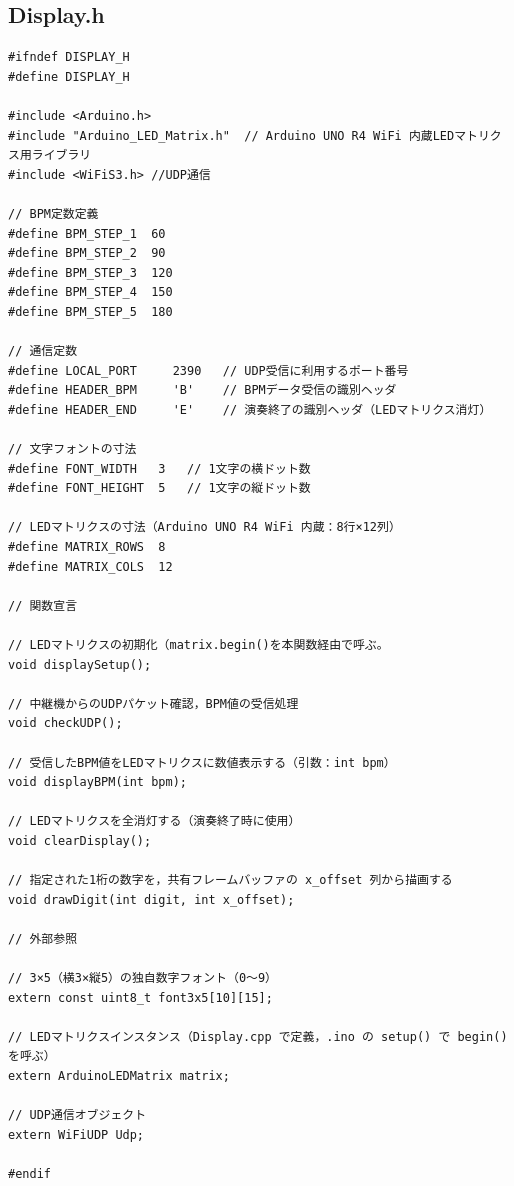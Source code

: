 \documentclass[uplatex,dvipdfmx,a4paper,11pt]{jsarticle}
\begin{document}
\subsection{Display.h}
\begin{lstlisting}
#ifndef DISPLAY_H
#define DISPLAY_H

#include <Arduino.h>
#include "Arduino_LED_Matrix.h"  // Arduino UNO R4 WiFi 内蔵LEDマトリクス用ライブラリ
#include <WiFiS3.h> //UDP通信

// BPM定数定義
#define BPM_STEP_1  60
#define BPM_STEP_2  90
#define BPM_STEP_3  120
#define BPM_STEP_4  150
#define BPM_STEP_5  180

// 通信定数
#define LOCAL_PORT     2390   // UDP受信に利用するポート番号
#define HEADER_BPM     'B'    // BPMデータ受信の識別ヘッダ
#define HEADER_END     'E'    // 演奏終了の識別ヘッダ（LEDマトリクス消灯）

// 文字フォントの寸法
#define FONT_WIDTH   3   // 1文字の横ドット数
#define FONT_HEIGHT  5   // 1文字の縦ドット数

// LEDマトリクスの寸法（Arduino UNO R4 WiFi 内蔵：8行×12列）
#define MATRIX_ROWS  8
#define MATRIX_COLS  12

// 関数宣言

// LEDマトリクスの初期化（matrix.begin()を本関数経由で呼ぶ。
void displaySetup();

// 中継機からのUDPパケット確認，BPM値の受信処理
void checkUDP();

// 受信したBPM値をLEDマトリクスに数値表示する（引数：int bpm）
void displayBPM(int bpm);

// LEDマトリクスを全消灯する（演奏終了時に使用）
void clearDisplay();

// 指定された1桁の数字を，共有フレームバッファの x_offset 列から描画する
void drawDigit(int digit, int x_offset);

// 外部参照

// 3×5（横3×縦5）の独自数字フォント（0〜9）
extern const uint8_t font3x5[10][15];

// LEDマトリクスインスタンス（Display.cpp で定義，.ino の setup() で begin() を呼ぶ）
extern ArduinoLEDMatrix matrix;

// UDP通信オブジェクト
extern WiFiUDP Udp;

#endif
\end{lstlisting}
\end{document}
